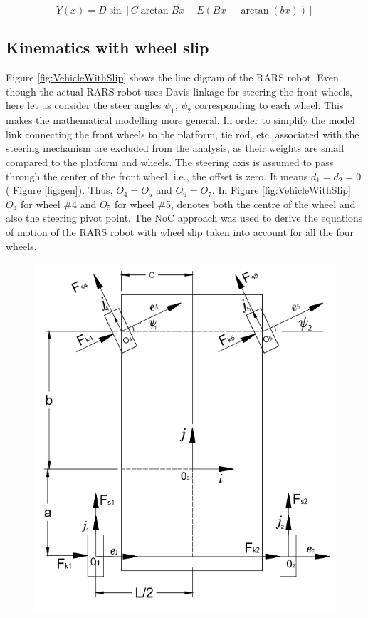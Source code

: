 { \begin{equation}\label{eqn:magic}
 Y(x)=D\sin[C \arctan{Bx -E(Bx-\arctan(bx))}]
 \end{equation}

\subsection{Kinematics with wheel slip}
\label{sec:slipKina}
 Figure \ref{fig:VehicleWithSlip}  shows the line digram of the RARS robot. Even though the actual RARS robot uses Davis linkage for steering the front wheels, here let us consider the steer angles $\psi_1$, $\psi_2$ corresponding to  each wheel. This makes the mathematical  modelling  more general. In order to simplify the model  link connecting the front wheels to the platform, tie rod, etc. associated with the steering mechanism   are excluded from the analysis, as their weights are small compared to the platform and wheels. The steering axis is assumed to pass through the center of the front wheel, i.e.,  the offset is zero.  It means $d_1=d_2=0$  ( Figure \ref{fig:gen}). Thus, $O_4=O_5$ and $O_6=O_7$. In Figure \ref{fig:VehicleWithSlip}  $O_4$  for wheel \#4 and $O_5$ for wheel \#5, denotes both the centre of the wheel and also the steering pivot point. The NoC approach was used to derive the equations of motion of the RARS robot with wheel slip taken into account for all the four wheels.
\begin{figure}
	\centering
	\includegraphics[width=\linewidth]{Chapter4/fig/VechileWithSlip}

\end{figure}}
